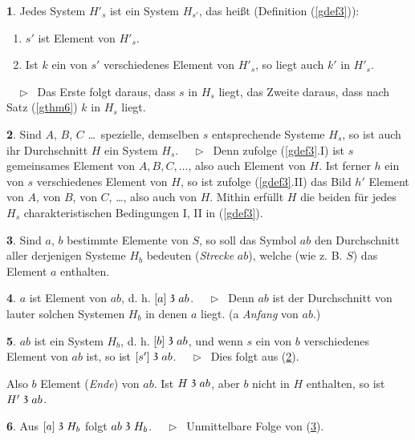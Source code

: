 \documentclass[leqno,hidelinks,a4paper]{article}
\theoremstyle{definition}
\newtheorem{sat}{\protect\satname}
\newtheorem{tef}[sat]{\protect\tefname}
\newcommand{\satname}{}
\newcommand{\tefname}{}
\renewcommand{\satname}{\hspace{-4pt}. Satz}%
\renewcommand{\tefname}{\hspace{-4pt}. Definition}%
\renewcommand{\satname}{\hspace{-4pt}. Theorem}%
\renewcommand{\tefname}{\hspace{-4pt}. Definition}%
\newcommand\Beweis{\newline $ \phantom{'.'} \rhd \ $}%
\newcommand\Prof{ $ \phantom{'.'} \rhd \ $}%
\newcommand\TeilVon{\mathrel{\raisebox{0.45ex}{$\mathfrak{3}$}}}
\begin{document}
\begin{paracol}{2}
\begin{sat}\label{gthm7}
Jedes System $H'_s$ ist ein System $H_{s'}$, das heißt (Definition (\ref{gdef3})):
\begin{enumerate}[I'.]
    \item $s'$ ist Element von $H'_s$.
    \item Ist $k$ ein von $s'$ verschiedenes Element von $H'_s$, so liegt auch $k'$ in $H'_s$.
\end{enumerate}
\Prof
Das Erste folgt daraus, dass $s$ in $H_s$ liegt, das Zweite daraus,
dass nach Satz (\ref{gthm6}) $k$ in $H_s$ liegt.
\end{sat}

\begin{sat}\label{gthm8}
Sind $A$, $B$, $C$ \ldots\ spezielle, demselben $s$ entsprechende Systeme $H_s$,
so ist auch ihr Durchschnitt $H$ ein System $H_s$.
\Beweis
Denn zufolge (\ref{gdef3}.I) ist $s$ gemeinsames Element von $A, B, C, \ldots$,
also auch Element von $H$. Ist ferner $h$ ein von $s$ verschiedenes Element von
$H$, so ist zufolge (\ref{gdef3}.II) das Bild $h'$ Element von $A$, von $B$, von
$C$, \ldots, also auch von $H$. Mithin erfüllt $H$ die beiden für jedes $H_s$
charakteristischen Bedingungen I, II in (\ref{gdef3}).
\end{sat}

\begin{tef}\label{gdef9}
Sind $a$, $b$ bestimmte Elemente von $S$, so soll das Symbol $ab$ den Durchschnitt
aller derjenigen Systeme $H_b$ bedeuten (\emph{Strecke} $ab$), welche (wie z. B. $S$)
das Element $a$ enthalten.
\end{tef}

\newpage

\begin{sat}\label{gthm10}
$a$ ist Element von $ab$, d. h. $[a] \TeilVon ab$.
\Beweis
Denn $ab$ ist der Durchschnitt von lauter solchen Systemen $H_b$ in denen $a$
liegt. (a \emph{Anfang} von $ab$.)
\end{sat}

\begin{sat}\label{gthm11}
$ab$ ist ein System $H_b$, d. h. $[b] \TeilVon ab$, und wenn $s$ ein von $b$
verschiedenes Element von $ab$ ist, so ist $[s'] \TeilVon ab$.
\Beweis
Dies folgt aus (\ref{gthm8}).
\end{sat}

Also $b$ Element (\emph{Ende}) von $ab$. Ist $H \TeilVon ab$, aber $b$ nicht in
$H$ enthalten, so ist $H' \TeilVon ab$.

\begin{sat}\label{gthm12}
Aus $[a] \TeilVon H_b$ folgt $ab \TeilVon H_b$.
\Beweis
Unmittelbare Folge von (\ref{gdef9}).
\end{sat}


\end{paracol}
\end{document}

